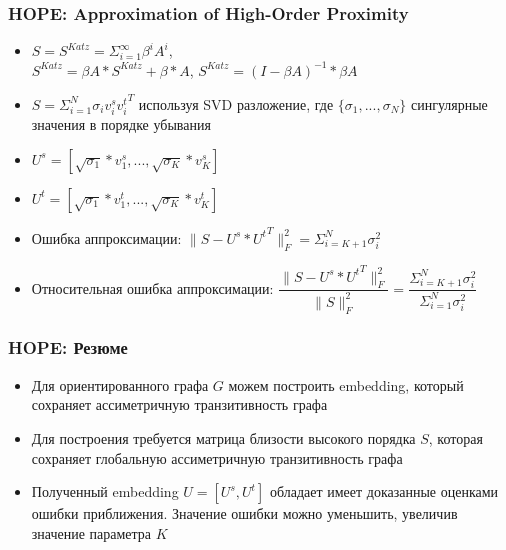 \documentclass[xcolor=table,english]{beamer}
\begin{document}
\begin{frame}[fragile] \frametitle{HOPE: Approximation of High-Order Proximity}
    \begin{itemize}
        \item $S = S^{Katz} = \Sigma_{i=1}^{\infty} \beta^i A^i$, \\$S^{Katz} = \beta A * S^{Katz} + \beta * A$, $S^{Katz} = (I - \beta A)^{-1} * \beta A$
        \item $S = \Sigma_{i=1}^N \sigma_i v_i^s {v_i^t}^T$ используя SVD разложение, где $\{\sigma_1, ... , \sigma_N\}$ сингулярные значения в порядке убывания
        \item $U^s = [ \sqrt{\sigma_1} * v_1^s, ..., \sqrt{\sigma_K} * v_K^s ]$
        \item $U^t = [ \sqrt{\sigma_1} * v_1^t, ..., \sqrt{\sigma_K} * v_K^t ]$
        \item Ошибка аппроксимации: $\| S - U^s * {U^t}^T \|^2_F = \Sigma_{i=K+1}^N \sigma_i^2$
        \item Относительная ошибка аппроксимации: $\dfrac{\| S - U^s * {U^t}^T \|^2_F}{\| S \|^2_F} = \dfrac{\Sigma_{i=K+1}^N \sigma_i^2}{\Sigma_{i=1}^N \sigma_i^2}$
    \end{itemize}
\end{frame}

\begin{frame}[fragile] \frametitle{HOPE: Резюме}
    \begin{itemize}
        \item Для ориентированного графа $G$ можем построить embedding, который сохраняет ассиметричную транзитивность графа
        \item Для построения требуется матрица близости высокого порядка $S$, которая сохраняет 
        глобальную ассиметричную транзитивность графа
        \item Полученный embedding $U = [U^s, U^t]$ обладает имеет доказанные оценками ошибки приближения. Значение ошибки можно уменьшить, увеличив значение параметра $K$
    \end{itemize}
\end{frame}
\end{document}
